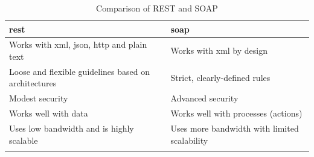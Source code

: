 \begin{longtable}{|p{8cm}||p{8cm}|}
      \hline
      \rowcolor{blue!20}
      \acrshort{rest}                                                            & \acrshort{soap}                              \\
      \endfirsthead
      \hline
      Works with \acrshort{xml}, \acrshort{json}, \acrshort{http} and plain text & Works with \acrshort{xml} by design          \\
      \hline
      Loose and flexible guidelines based on architectures                       & Strict, clearly-defined rules                \\
      \hline
      Modest security                                                            & Advanced security                            \\
      \hline
      Works well with data                                                       & Works well with processes (actions)          \\
      \hline
      Uses low bandwidth and is highly scalable                                  & Uses more bandwidth with limited scalability \\
      \hline
      \caption{Comparison of REST and SOAP}
      \label{tab:restvsoap}
\end{longtable}

